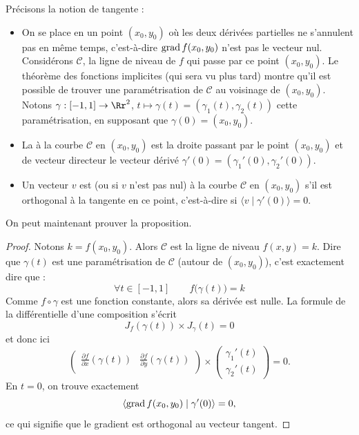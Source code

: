 \documentclass[11pt, class=report,crop=false]{standalone}
\begin{document}
Précisons la notion de tangente :
\begin{itemize}
  \item On se place en un point $(x_0,y_0)$ où les deux dérivées partielles ne s'annulent pas en même temps, c'est-à-dire $\operatorname{grad} f(x_0,y_0)$ n'est pas le vecteur nul. Considérons $\mathcal{C}$, la ligne de niveau de $f$ qui passe par ce point $(x_0,y_0)$. Le théorème des fonctions implicites (qui sera vu plus tard) montre qu'il est possible de trouver une paramétrisation de $\mathcal{C}$ au voisinage de $(x_0,y_0)$. Notons $\gamma : [-1,1] \to \Rr^2$, $t \mapsto \gamma(t)= (\gamma_1(t),\gamma_2(t))$ cette paramétrisation, en supposant que $\gamma(0) = (x_0,y_0)$. 


  \item La  à la courbe $\mathcal{C}$ en $(x_0,y_0)$ est la droite passant par le point $(x_0,y_0)$ et de vecteur directeur le vecteur dérivé $\gamma'(0) = (\gamma_1'(0),\gamma_2'(0))$.
  
  \item Un vecteur $v$ est  (ou  si $v$ n'est pas nul) à la courbe $\mathcal{C}$ en $(x_0,y_0)$ s'il est orthogonal à la tangente en ce point, c'est-à-dire si $\langle v \mid \gamma'(0)\rangle = 0$.
\end{itemize}

On peut maintenant prouver la proposition.
\begin{proof}
Notons $k = f(x_0,y_0)$. Alors $\mathcal{C}$ est la ligne de niveau $f(x,y)=k$.
Dire que $\gamma(t)$ est une paramétrisation de $\mathcal{C}$ (autour de $(x_0,y_0)$), 
c'est exactement dire que :
$$\forall t \in [-1,1] \qquad f \big( \gamma(t) \big) = k$$
Comme $f \circ \gamma$ est une fonction constante, alors sa dérivée est nulle.
La formule de la différentielle d'une composition s'écrit 
$$J_f (\gamma(t)) \times J_\gamma (t) = 0$$
et donc ici 
$$
\begin{pmatrix}
\frac{\partial f}{\partial x} (\gamma(t)) & 
\frac{\partial f}{\partial y} (\gamma(t)) \\
\end{pmatrix}
\times
\begin{pmatrix}
\gamma_1'(t)\\
\gamma_2'(t)
\end{pmatrix}
= 0.$$
En $t=0$, on trouve exactement 
$$\langle \operatorname{grad} f(x_0,y_0) \mid \gamma'(0) \rangle = 0,$$
ce qui signifie que le gradient est orthogonal au vecteur tangent.
\end{proof}
\end{document}
